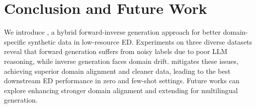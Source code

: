 \section{Conclusion and Future Work}

We introduce \modelName{}, a hybrid forward-inverse generation approach for better domain-specific synthetic data in low-resource ED.
Experiments on three diverse datasets reveal that forward generation suffers from noisy labels due to poor LLM reasoning, while inverse generation faces domain drift.
\modelName{} mitigates these issues, achieving superior domain alignment and cleaner data, leading to the best downstream ED performance in zero and few-shot settings.
Future works can explore enhancing stronger domain alignment and extending \modelName{} for multilingual generation.
